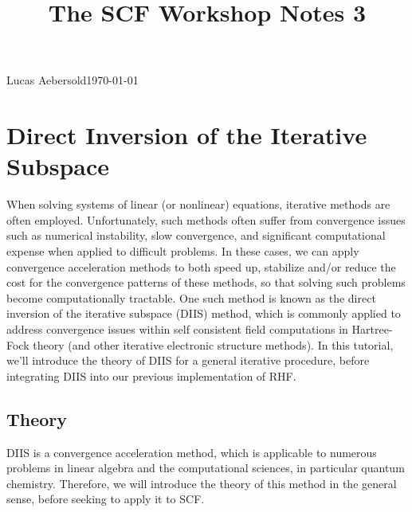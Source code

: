 \documentclass[11pt]{article}
\begin{document}
\title{The SCF Workshop Notes 3}{Lucas Aebersold}{\today}
\setcounter{section}{2}
\section{Direct Inversion of the Iterative Subspace}

When solving systems of linear (or nonlinear) equations, iterative methods are often employed. Unfortunately, such methods often suffer from convergence issues such as numerical instability, slow convergence, and significant computational expense when applied to difficult problems. In these cases, we can apply convergence acceleration methods to both speed up, stabilize and/or reduce the cost for the convergence patterns of these methods, so that solving such problems become computationally tractable.  One such method is known as the direct inversion of the iterative subspace (DIIS) method, which is commonly applied to address convergence issues within self consistent field computations in Hartree-Fock theory (and other iterative electronic structure methods).  In this tutorial, we'll introduce the theory of DIIS for a general iterative procedure, before integrating DIIS into our previous implementation of RHF.

\subsection{Theory}

DIIS is a convergence acceleration method, which is applicable to numerous problems in linear algebra and the computational sciences, in particular quantum chemistry. Therefore, we will introduce the theory of this method in the general sense, before seeking to apply it to SCF.  
\end{document}
